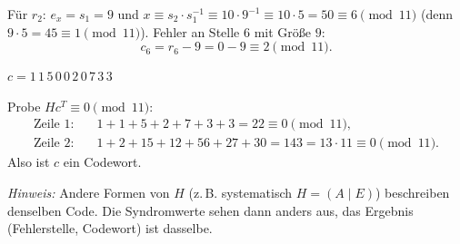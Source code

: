  Für $r_2$: $e_x = s_1 = 9$ und $x \equiv s_2 \cdot s_1^{-1} \equiv 10 \cdot 9^{-1} \equiv 10 \cdot 5 = 50 \equiv 6 \pmod{11}$
(denn $9 \cdot 5 = 45 \equiv 1 \pmod{11}$). Fehler an Stelle $6$ mit Größe $9$:
\[
c_6 = r_6 - 9 = 0 - 9 \equiv 2 \pmod{11}.
\]
\begin{ergebnis} $c = 1\,1\,5\,0\,0\,2\,0\,7\,3\,3$ \end{ergebnis}

 Probe $H c^T \equiv 0 \pmod{11}$:
\begin{align*}
\text{Zeile 1:}\quad & 1 + 1 + 5 + 2 + 7 + 3 + 3 = 22 \equiv 0 \pmod{11},\\
\text{Zeile 2:}\quad & 1 + 2 + 15 + 12 + 56 + 27 + 30 = 143 = 13 \cdot 11 \equiv 0 \pmod{11}.
\end{align*}
Also ist $c$ ein Codewort. \checkmark

\medskip
{\small\textit{Hinweis:} Andere Formen von $H$ (z.\,B. systematisch $H = (A \mid E)$) beschreiben denselben Code.
Die Syndromwerte sehen dann anders aus, das Ergebnis (Fehlerstelle, Codewort) ist dasselbe.}
